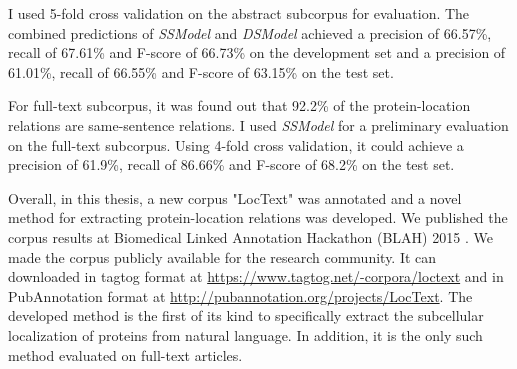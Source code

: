 I used 5-fold cross validation on the abstract subcorpus for evaluation. The combined predictions of \textit{SSModel} and \textit{DSModel} achieved a precision of 66.57\%, recall of 67.61\% and F-score of 66.73\% on the development set and a precision of 61.01\%, recall of 66.55\% and F-score of 63.15\% on the test set.

For full-text subcorpus, it was found out that 92.2\% of the protein-location relations are same-sentence relations. I used \textit{SSModel} for a preliminary evaluation on the full-text subcorpus. Using 4-fold cross validation, it could achieve a precision of 61.9\%, recall of 86.66\% and F-score of 68.2\% on the test set.

Overall, in this thesis, a new corpus "LocText" was annotated and a novel method for extracting protein-location relations was developed. We published the corpus results \cite{goldberg2015linked} at Biomedical Linked Annotation Hackathon (BLAH) 2015 \cite{blah}. We made the corpus publicly available for the research community. It can downloaded in tagtog format at \url{https://www.tagtog.net/-corpora/loctext} and in PubAnnotation format at \url{http://pubannotation.org/projects/LocText}. The developed method is the first of its kind to specifically extract the subcellular localization of proteins from natural language. In addition, it is the only such method evaluated on full-text articles.

